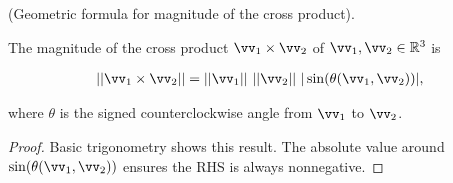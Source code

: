 \begin{theorem}
    (Geometric formula for magnitude of the cross product).
    
    The magnitude of the cross product $\vv_1 \times \vv_2$ of $\vv_1, \vv_2 \in \R^3$ is
    
    \begin{align*}
        ||\vv_1 \times \vv_2 || = ||\vv_1|| \spc ||\vv_2|| \spc |\sin(\theta(\vv_1, \vv_2))|,
    \end{align*}
    
    where $\theta$ is the signed counterclockwise angle from $\vv_1$ to $\vv_2$.
\end{theorem}

\begin{proof}
   Basic trigonometry shows this result. The absolute value around $\sin(\theta(\vv_1, \vv_2))$ ensures the RHS is always nonnegative.
\end{proof}

